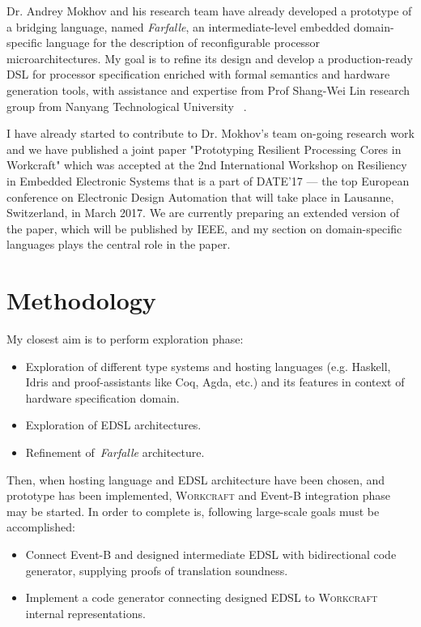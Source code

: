 \documentclass[10pt, a4paper]{article}
\begin{document}
Dr. Andrey Mokhov and his research team have already developed a prototype of a
bridging language, named \emph{Farfalle}, an intermediate-level embedded
domain-specific language for the description of reconfigurable processor
microarchitectures. My goal is to refine its design and develop a
production-ready DSL for processor specification enriched with formal semantics 
and hardware generation tools, with assistance and expertise from Prof 
Shang-Wei Lin research group from Nanyang Technological University
~\cite{Lin:2014:CSC:2962288.2962317}.  

I have already started to contribute to Dr. Mokhov's team on-going research
work and we have published a joint paper "Prototyping Resilient Processing Cores
in Workcraft" which was accepted at the 2nd International Workshop on Resiliency
in Embedded Electronic Systems that is a part of DATE'17 --- the top European
conference on Electronic Design Automation that will take place in Lausanne,
Switzerland, in March 2017. We are currently preparing an extended version of
the paper, which will be published by IEEE, and my section on domain-specific
languages plays the central role in the paper.

\section{Methodology}

My closest aim is to perform exploration phase: 

\begin{itemize} 
\item Exploration of different type systems and hosting languages 
(e.g. Haskell, Idris and proof-assistants like Coq, Agda, etc.) and its 
features in context of hardware specification domain.
\item Exploration of EDSL architectures.
\item Refinement of~\emph{Farfalle} architecture.
\end{itemize}

Then, when hosting language and EDSL architecture have been chosen, 
and prototype has been implemented, \textsc{Workcraft} and Event-B integration 
phase may be started. In order to complete is, following large-scale goals
must be accomplished:

\begin{itemize} 
\item Connect Event-B and designed intermediate EDSL with bidirectional code
generator, supplying proofs of translation soundness.
\item Implement a code generator connecting designed EDSL to \textsc{Workcraft}
internal representations.
\end{itemize}

\printbibliography
\end{document}
